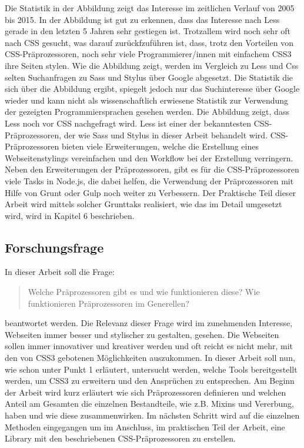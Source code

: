 Die Statistik in der Abbildung zeigt das Interesse im zeitlichen Verlauf von 2005 bis 2015. \newline
In der Abbildung ist gut zu erkennen, dass das Interesse nach Less gerade in den letzten 5 Jahren sehr gestiegen ist. Trotzallem wird noch sehr oft nach CSS gesucht, was darauf zurückfzuführen ist, dass, trotz den Vorteilen von CSS-Präprozessoren, noch sehr viele Programmierer/innen mit einfachem CSS3 ihre Seiten stylen. \newline
Wie die Abbildung zeigt, werden im Vergleich zu Less und Css selten Suchanfragen zu Sass und Stylus über Google abgesetzt.\newline
Die Statistik die sich über die Abbildung ergibt, spiegelt jedoch nur das Suchinteresse über Google wieder und kann nicht als wissenschaftlich erwiesene Statistik zur Verwendung der gezeigten Programmiersprachen gesehen werden.\newline
Die Abbildung zeigt, dass Less noch vor CSS nachgefragt wird. Less ist einer der bekanntesten CSS-Präprozessoren, der wie Sass und Stylus in dieser Arbeit behandelt wird. \newline
CSS-Präprozessoren bieten viele Erweiterungen, welche die Erstellung eines Webseitenstylings vereinfachen und den Workflow bei der Erstellung verringern. Neben den Erweiterungen der Präprozessoren, gibt es für die CSS-Präprozessoren viele Tasks in Node.js, die dabei helfen, die Verwendung der Präprozessoren mit Hilfe von Grunt oder Gulp noch weiter zu Verbessern. \newline
Der Praktische Teil dieser Arbeit wird mittels solcher Grunttaks realisiert, wie das im Detail umgesetzt wird, wird in Kapitel 6 beschrieben.\newline
\subsection{Forschungsfrage}
\label{subsection:Coding}
In dieser Arbeit soll die Frage:
\begin{quote}
\glqq{} Welche Präprozessoren gibt es und wie funktionieren diese? Wie funktionieren Präprozessoren im Generellen? \grqq{}
\end{quote}
beantwortet werden.\newline
Die Relevanz dieser Frage wird im zunehmenden Interesse, Webseiten immer besser und stylischer zu gestalten, gesehen. Die Webseiten sollen immer innovativer und kreativer werden und oft reicht es nicht mehr, mit den von CSS3 gebotenen Möglichkeiten auszukommen.\newline
In dieser Arbeit soll nun, wie schon unter Punkt 1 erläutert, untersucht werden, welche Tools bereitgestellt werden, um CSS3 zu erweitern und den Ansprüchen zu entsprechen.\newline
Am Beginn der Arbeit wird kurz erläutert wie sich Präprozessoren definieren und welchen Anteil am Gesamten die einzelnen Bestandteile, wie z.B. Mixins und Vererbung, haben und wie diese zusammenwirken. Im nächsten Schritt wird auf die einzelnen Methoden eingegangen um im Anschluss, im praktischen Teil der Arbeit, eine Library mit den beschriebenen CSS-Präprozessoren zu erstellen. 

